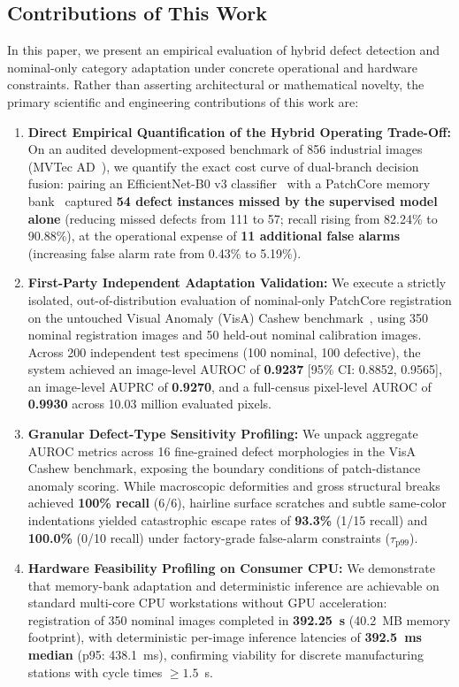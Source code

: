 \documentclass[journal]{IEEEtran}
\begin{document}
\subsection{Contributions of This Work}
In this paper, we present an empirical evaluation of hybrid defect detection and nominal-only category adaptation under concrete operational and hardware constraints. Rather than asserting architectural or mathematical novelty, the primary scientific and engineering contributions of this work are:
\begin{enumerate}
    \item \textbf{Direct Empirical Quantification of the Hybrid Operating Trade-Off:} On an audited development-exposed benchmark of 856 industrial images (MVTec AD~\cite{bergmann2021mvtec}), we quantify the exact cost curve of dual-branch decision fusion: pairing an EfficientNet-B0 v3 classifier~\cite{tan2019efficientnet} with a PatchCore memory bank~\cite{roth2022towards} captured \textbf{54 defect instances missed by the supervised model alone} (reducing missed defects from 111 to 57; recall rising from 82.24\% to 90.88\%), at the operational expense of \textbf{11 additional false alarms} (increasing false alarm rate from 0.43\% to 5.19\%).
    \item \textbf{First-Party Independent Adaptation Validation:} We execute a strictly isolated, out-of-distribution evaluation of nominal-only PatchCore registration on the untouched Visual Anomaly (VisA) Cashew benchmark~\cite{zou2022spot}, using 350 nominal registration images and 50 held-out nominal calibration images. Across 200 independent test specimens (100 nominal, 100 defective), the system achieved an image-level AUROC of \textbf{0.9237} [95\% CI: 0.8852, 0.9565], an image-level AUPRC of \textbf{0.9270}, and a full-census pixel-level AUROC of \textbf{0.9930} across 10.03 million evaluated pixels.
    \item \textbf{Granular Defect-Type Sensitivity Profiling:} We unpack aggregate AUROC metrics across 16 fine-grained defect morphologies in the VisA Cashew benchmark, exposing the boundary conditions of patch-distance anomaly scoring. While macroscopic deformities and gross structural breaks achieved \textbf{100\% recall} (6/6), hairline surface scratches and subtle same-color indentations yielded catastrophic escape rates of \textbf{93.3\%} (1/15 recall) and \textbf{100.0\%} (0/10 recall) under factory-grade false-alarm constraints ($\tau_{\text{p99}}$).
    \item \textbf{Hardware Feasibility Profiling on Consumer CPU:} We demonstrate that memory-bank adaptation and deterministic inference are achievable on standard multi-core CPU workstations without GPU acceleration: registration of 350 nominal images completed in \textbf{392.25~s} (40.2~MB memory footprint), with deterministic per-image inference latencies of \textbf{392.5~ms median} (p95: 438.1~ms), confirming viability for discrete manufacturing stations with cycle times $\ge 1.5$~s.

\end{enumerate}
\end{document}
